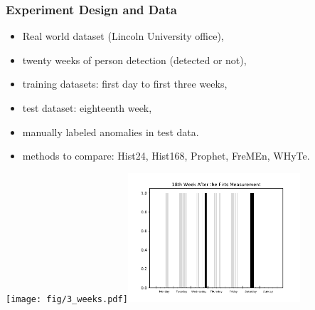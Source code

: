 \begin{frame}
   \frametitle{Experiment Design and Data}
    \begin{itemize}
        \item Real world dataset (Lincoln University office),
        \item twenty weeks of person detection (detected or not),
        \item training datasets: first day to first three weeks,
        \item test dataset: eighteenth week,
        \item manually labeled anomalies in test data.
        \item methods to compare: Hist24, Hist168, Prophet, FreMEn, WHyTe.
       \end{itemize}

\hfill\texttt{[image: fig/3\_weeks.pdf]}\hfill\includegraphics[width=0.48\textwidth]{fig/outliers_test.pdf}\hfill


\end{frame}



